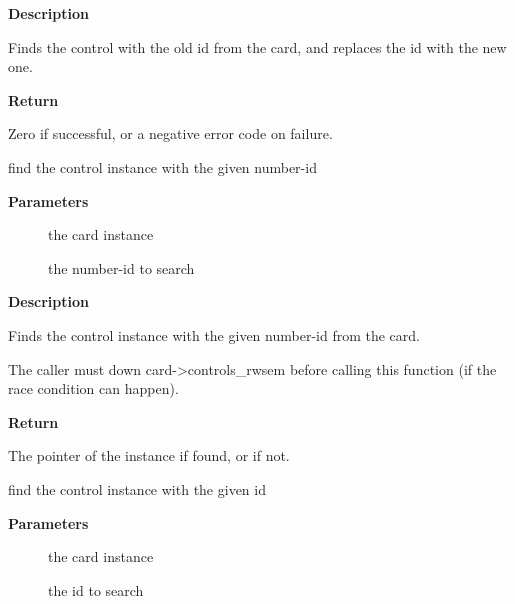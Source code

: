 \documentclass[a4paper,8pt,english]{sphinxmanual}
\begin{document}
\textbf{Description}

Finds the control with the old id from the card, and replaces the
id with the new one.

\textbf{Return}

Zero if successful, or a negative error code on failure.

\begin{fulllineitems}
\label{sound/kernel-api/alsa-driver-api:c.snd_ctl_find_numid}
find the control instance with the given number-id

\end{fulllineitems}


\textbf{Parameters}
\begin{description}
\item[{}] \leavevmode
the card instance

\item[{}] \leavevmode
the number-id to search

\end{description}

\textbf{Description}

Finds the control instance with the given number-id from the card.

The caller must down card-\textgreater{}controls\_rwsem before calling this function
(if the race condition can happen).

\textbf{Return}

The pointer of the instance if found, or  if not.

\begin{fulllineitems}
\label{sound/kernel-api/alsa-driver-api:c.snd_ctl_find_id}
find the control instance with the given id

\end{fulllineitems}


\textbf{Parameters}
\begin{description}
\item[{}] \leavevmode
the card instance

\item[{}] \leavevmode
the id to search

\end{description}
\end{document}
